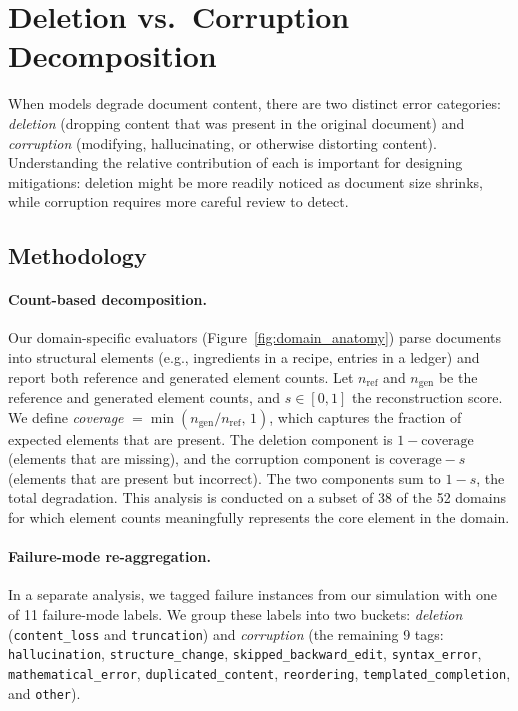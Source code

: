 \documentclass{article} %
\begin{document}
\section{Deletion vs.\ Corruption Decomposition} \label{app:deletion_corruption}

When models degrade document content, there are two distinct error categories: \textit{deletion} (dropping content that was present in the original document) and \textit{corruption} (modifying, hallucinating, or otherwise distorting content). Understanding the relative contribution of each is important for designing mitigations: deletion might be more readily noticed as document size shrinks, while corruption requires more careful review to detect.

\subsection{Methodology}

\paragraph{Count-based decomposition.} Our domain-specific evaluators (Figure~\ref{fig:domain_anatomy}) parse documents into structural elements (e.g., ingredients in a recipe, entries in a ledger) and report both reference and generated element counts. Let $n_{\mathrm{ref}}$ and $n_{\mathrm{gen}}$ be the reference and generated element counts, and $s \in [0, 1]$ the reconstruction score. We define \textit{coverage} $= \min(n_{\mathrm{gen}} / n_{\mathrm{ref}},\, 1)$, which captures the fraction of expected elements that are present. The deletion component is $1 - \text{coverage}$ (elements that are missing), and the corruption component is $\text{coverage} - s$ (elements that are present but incorrect). The two components sum to $1 - s$, the total degradation. This analysis is conducted on a subset of 38 of the 52 domains for which element counts meaningfully represents the core element in the domain.

\paragraph{Failure-mode re-aggregation.} In a separate analysis, we tagged failure instances from our simulation with one of 11 failure-mode labels. We group these labels into two buckets: \textit{deletion} (\texttt{content\_loss} and \texttt{truncation}) and \textit{corruption} (the remaining 9 tags: \texttt{hallucination}, \texttt{structure\_change}, \texttt{skipped\_backward\_edit}, \texttt{syntax\_error}, \texttt{mathematical\_error}, \texttt{duplicated\_content}, \texttt{reordering}, \texttt{templated\_completion}, and \texttt{other}).
\end{document}
